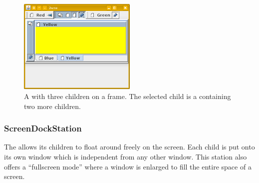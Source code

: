 \begin{figure}[h!]
  \centering
    \includegraphics[width=0.5\textwidth]{basics/FlapDockStation}
  \caption{A  with three children on a frame. The selected child is a  containing two more children.}
\end{figure}


\subsubsection{ScreenDockStation}
The  allows its children to float around freely on the screen. Each child is put onto its own window which is independent from any other window. This station also offers a ``fullscreen mode'' where a window is enlarged to fill the entire space of a screen.

